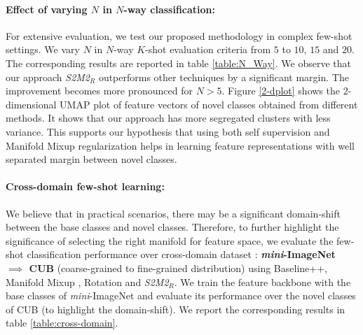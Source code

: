 \documentclass[10pt,twocolumn,letterpaper]{article}
\begin{document}
\paragraph{Effect of varying $N$ in $N$-way classification:}
For extensive evaluation, we test our proposed methodology in complex few-shot settings. We vary $N$ in $N$-way $K$-shot evaluation criteria from $5$ to $10$, $15$ and $20$. The corresponding results are reported in table \ref{table:N_Way}. We observe that our approach \textit{S2M2$_R$} outperforms other techniques by a significant margin. The improvement becomes more pronounced for $N>5$. Figure \ref{2-dplot} shows the 2-dimensional UMAP \cite{umaplearn} plot of feature vectors of novel classes obtained from different methods. It shows that our approach has more segregated clusters with less variance. This supports our hypothesis that using both self supervision and Manifold Mixup regularization helps in learning feature representations with well separated margin between novel classes. 
\paragraph{Cross-domain few-shot learning:}
We believe that in practical scenarios, there may be a significant domain-shift between the base classes and novel classes. Therefore, to further highlight the significance of selecting the right manifold for feature space, we evaluate the few-shot classification performance over cross-domain dataset : \textbf{\textit{mini}-ImageNet $\implies$ CUB} (coarse-grained to fine-grained distribution) using Baseline++, Manifold Mixup \cite{verma2019manifold}, Rotation \cite{s4l2019} and \textit{S2M2$_R$}.
We train the feature backbone with the base classes of \textit{mini}-ImageNet  and evaluate its performance over the novel classes of CUB (to highlight the domain-shift). We report the corresponding results in table \ref{table:cross-domain}.



\begin{table}[t]
\centering
{}
\label{table:cross-domain}
\end{table}
\end{document}
